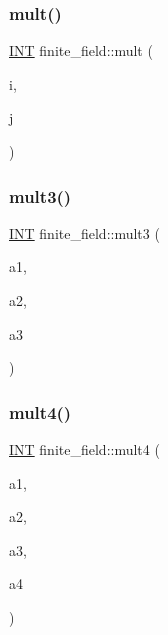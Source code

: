 \mbox{\label{classfinite__field_a24fb5917aa6d4d656fd855b7f44a13b0}} 
\subsubsection{\texorpdfstring{mult()}{mult()}}
{\footnotesize\ttfamily \mbox{\hyperlink{galois_8h_a09fddde158a3a20bd2dcadb609de11dc}{I\+NT}} finite\+\_\+field\+::mult (\begin{DoxyParamCaption}\item[{\mbox{\hyperlink{galois_8h_a09fddde158a3a20bd2dcadb609de11dc}{I\+NT}}}]{i,  }\item[{\mbox{\hyperlink{galois_8h_a09fddde158a3a20bd2dcadb609de11dc}{I\+NT}}}]{j }\end{DoxyParamCaption})}

\mbox{\label{classfinite__field_a8075bbc643e9198c0a8f1d1eaa2faee3}} 
\subsubsection{\texorpdfstring{mult3()}{mult3()}}
{\footnotesize\ttfamily \mbox{\hyperlink{galois_8h_a09fddde158a3a20bd2dcadb609de11dc}{I\+NT}} finite\+\_\+field\+::mult3 (\begin{DoxyParamCaption}\item[{\mbox{\hyperlink{galois_8h_a09fddde158a3a20bd2dcadb609de11dc}{I\+NT}}}]{a1,  }\item[{\mbox{\hyperlink{galois_8h_a09fddde158a3a20bd2dcadb609de11dc}{I\+NT}}}]{a2,  }\item[{\mbox{\hyperlink{galois_8h_a09fddde158a3a20bd2dcadb609de11dc}{I\+NT}}}]{a3 }\end{DoxyParamCaption})}

\mbox{\label{classfinite__field_a5d3257e6d079df516c0dce0c51aea44f}} 
\subsubsection{\texorpdfstring{mult4()}{mult4()}}
{\footnotesize\ttfamily \mbox{\hyperlink{galois_8h_a09fddde158a3a20bd2dcadb609de11dc}{I\+NT}} finite\+\_\+field\+::mult4 (\begin{DoxyParamCaption}\item[{\mbox{\hyperlink{galois_8h_a09fddde158a3a20bd2dcadb609de11dc}{I\+NT}}}]{a1,  }\item[{\mbox{\hyperlink{galois_8h_a09fddde158a3a20bd2dcadb609de11dc}{I\+NT}}}]{a2,  }\item[{\mbox{\hyperlink{galois_8h_a09fddde158a3a20bd2dcadb609de11dc}{I\+NT}}}]{a3,  }\item[{\mbox{\hyperlink{galois_8h_a09fddde158a3a20bd2dcadb609de11dc}{I\+NT}}}]{a4 }\end{DoxyParamCaption})}

